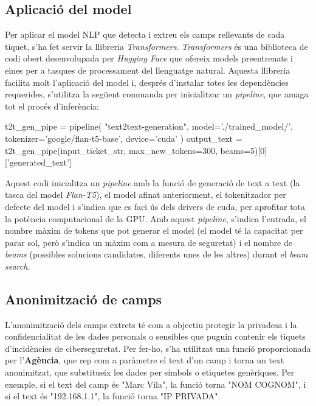 \subsection{Aplicació del model}
Per aplicar el model NLP que detecta i extreu els camps rellevants de cada tiquet, s'ha fet servir la llibreria \textit{Transformers}.
\textit{Transformers} és una biblioteca de codi obert desenvolupada per \textit{Hugging Face} \cite{Hugging-Face} que ofereix models preentrenats i eines per a tasques de processament del llenguatge natural. Aquesta llibreria facilita molt l'aplicació del model i, després d'instalar totes les dependències requerides, s'utilitza la següent commanda per inicialitzar un \textit{pipeline}, que amaga tot el procés d'inferència:

\begin{python}
t2t_gen_pipe = pipeline(
     "text2text-generation",
     model='./trained_model/',
     tokenizer='google/flan-t5-base',
     device='cuda'
     )     
output_text = t2t_gen_pipe(input_ticket_str, max_new_tokens=300, beams=5)[0]['generated_text']
\end{python}

Aquest codi inicialitza un \textit{pipeline} amb la funció de generació de text a text (la tasca del model \textit{Flan-T5}), el model afinat anteriorment, el tokenitzador per defecte del model i s'indica que es faci ús dels drivers de cuda, per aprofitar tota la potència computacional de la GPU. Amb aquest \textit{pipeline}, s'indica l'entrada, el nombre màxim de tokens que pot generar el model (el model té la capacitat per parar sol, però s'indica un màxim com a mesura de seguretat) i el nombre de \textit{beams} (possibles solucions candidates, diferents unes de les altres) durant el \textit{beam search}.


\subsection{Anonimització de camps}
L'anonimització dels camps extrets té com a objectiu protegir la privadesa i la confidencialitat de les dades personals o sensibles que puguin contenir els tiquets d'incidències de ciberseguretat. Per fer-ho, s'ha utilitzat una funció proporcionada per l'\textbf{Agència}, que rep com a paràmetre el text d'un camp i torna un text anonimitzat, que substitueix les dades per símbols o etiquetes genèriques. Per exemple, si el text del camp és "Marc Vila", la funció torna "NOM COGNOM", i si el text és "192.168.1.1", la funció torna "IP PRIVADA".


